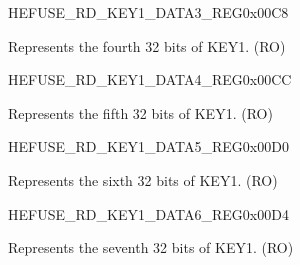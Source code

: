 \begin{register}{H}{EFUSE\_RD\_KEY1\_DATA3\_REG}{0x{}00C8}\label{regdesc:EFUSERDKEY1DATA3REG}
%
\regnewline%
\begin{regdesc}\begin{reglist}
\label{fielddesc:EFUSEKEY1DATA3}\item [EFUSE\_KEY1\_DATA3] Represents the fourth 32 bits of KEY1. (RO)
\end{reglist}\end{regdesc}
\end{register}


\begin{register}{H}{EFUSE\_RD\_KEY1\_DATA4\_REG}{0x{}00CC}\label{regdesc:EFUSERDKEY1DATA4REG}
%
\regnewline%
\begin{regdesc}\begin{reglist}
\label{fielddesc:EFUSEKEY1DATA4}\item [EFUSE\_KEY1\_DATA4] Represents the fifth 32 bits of KEY1. (RO)
\end{reglist}\end{regdesc}
\end{register}


\begin{register}{H}{EFUSE\_RD\_KEY1\_DATA5\_REG}{0x{}00D0}\label{regdesc:EFUSERDKEY1DATA5REG}
%
\regnewline%
\begin{regdesc}\begin{reglist}
\label{fielddesc:EFUSEKEY1DATA5}\item [EFUSE\_KEY1\_DATA5] Represents the sixth 32 bits of KEY1. (RO)
\end{reglist}\end{regdesc}
\end{register}


\begin{register}{H}{EFUSE\_RD\_KEY1\_DATA6\_REG}{0x{}00D4}\label{regdesc:EFUSERDKEY1DATA6REG}
%
\regnewline%
\begin{regdesc}\begin{reglist}
\label{fielddesc:EFUSEKEY1DATA6}\item [EFUSE\_KEY1\_DATA6] Represents the seventh 32 bits of KEY1. (RO)
\end{reglist}\end{regdesc}
\end{register}


